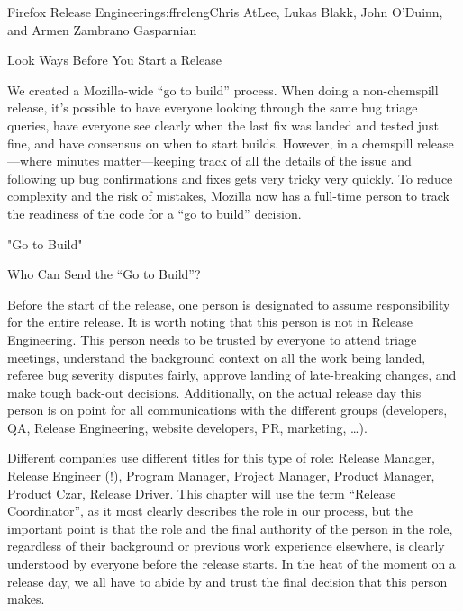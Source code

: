 \begin{aosachapter}{Firefox Release Engineering}{s:ffreleng}{Chris AtLee, Lukas Blakk, John O'Duinn, and Armen Zambrano Gasparnian}
\begin{aosasect1}{Look  Ways Before You Start a Release}
\begin{aosaenumerate}
\item We created a Mozilla-wide ``go to build'' process. When doing a
  non-chemspill release, it's possible to have everyone looking
  through the same bug triage queries, have everyone see clearly when
  the last fix was landed and tested just fine, and have consensus on
  when to start builds. However, in a chemspill release---where
  minutes matter---keeping track of all the details of the issue and
  following up bug confirmations and fixes gets very tricky very
  quickly.  To reduce complexity and the risk of mistakes, Mozilla
  now has a full-time person 
  to track the readiness of the code for a ``go to build''
  decision.  

\end{aosaenumerate}


\end{aosasect1}

\begin{aosasect1}{"Go to Build"}

\begin{aosasect2}{Who Can Send the ``Go to Build''?}

Before the start of the release, one person is designated to assume
responsibility for the entire release. It is worth noting that
this person is not in Release Engineering. This person needs to be
trusted by everyone to attend triage meetings, understand the
background context on all the work being landed, referee bug severity
disputes fairly, approve landing of late-breaking changes, and make
tough back-out decisions.  Additionally, on the actual release day
this person is on point for all communications with the different
groups (developers, QA, Release Engineering, website developers, PR,
marketing, {\ldots}).

Different companies use different titles for this type of role:
Release Manager, Release Engineer (!), Program Manager,
Project Manager, Product Manager, Product Czar, Release Driver. This
chapter will use the term ``Release Coordinator'', as it most clearly
describes the role in our process, but the important point is that the
role and the final authority of the person in the role, regardless of 
their background or previous work experience elsewhere, is clearly understood by
everyone before the release starts. In the heat of the moment on a
release day, we all have to abide by and trust the final decision
that this person makes.


\end{aosasect2}
\end{aosasect1}
\end{aosachapter}
